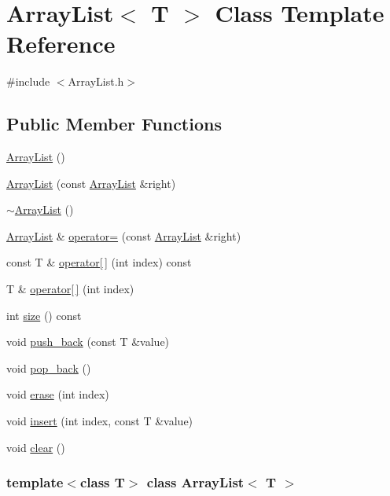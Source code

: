 \hypertarget{class_array_list}{
\section{ArrayList$<$ T $>$ Class Template Reference}
\label{class_array_list}
}


{\ttfamily \#include $<$ArrayList.h$>$}

\subsection*{Public Member Functions}
\begin{DoxyCompactItemize}
\item 
\hyperlink{class_array_list_a77ba51ae82bb2246563af5c4d64d438e}{ArrayList} ()
\item 
\hyperlink{class_array_list_aa4936cd0b9423eba7a9f38f3c62cfc7c}{ArrayList} (const \hyperlink{class_array_list}{ArrayList} \&right)
\item 
\hyperlink{class_array_list_a4af637822f64b61267b1e0ed4d4fca33}{$\sim$ArrayList} ()
\item 
\hyperlink{class_array_list}{ArrayList} \& \hyperlink{class_array_list_ae27782de18cb09f54fffba59f3f77d92}{operator=} (const \hyperlink{class_array_list}{ArrayList} \&right)
\item 
const T \& \hyperlink{class_array_list_a627f1cc60e0b9a85d869957a839bc064}{operator\mbox{[}$\,$\mbox{]}} (int index) const 
\item 
T \& \hyperlink{class_array_list_aaf3e10ff2125cc396e3c5d357bf94f1e}{operator\mbox{[}$\,$\mbox{]}} (int index)
\item 
int \hyperlink{class_array_list_aff9c6ac40886044e4653174950d23e74}{size} () const 
\item 
void \hyperlink{class_array_list_a7b5376678a9b5af0e0ed913fbe04b902}{push\_\-back} (const T \&value)
\item 
void \hyperlink{class_array_list_ad98cc674ef8dcc42f53b4836416a289c}{pop\_\-back} ()
\item 
void \hyperlink{class_array_list_a18695cf2c26e9c6ef585ec77afc19fc6}{erase} (int index)
\item 
void \hyperlink{class_array_list_addb12a5554260fa1f386160ce8534db0}{insert} (int index, const T \&value)
\item 
void \hyperlink{class_array_list_acb53d54675318c94332d0ec8b6819eb3}{clear} ()
\end{DoxyCompactItemize}
\subsubsection*{template$<$class T$>$ class ArrayList$<$ T $>$}



